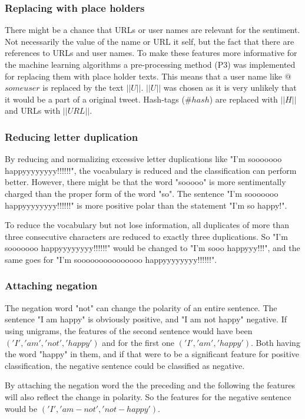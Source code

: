 \subsubsection{Replacing with place holders}
There might be a chance that URLs or user names are relevant for the sentiment. Not necessarily the value of the name or URL it self, but the fact that there are references to URLs and user names. To make these features more informative for the machine learning algorithms a pre-processing method (P3) was implemented for replacing them with place holder texts. This means that a user name like $@$$someuser$ is replaced by the text $||U||$. $||U||$ was chosen as it is very unlikely that it would be a part of a original tweet. Hash-tags ($\#hash$) are replaced with $||H||$ and URLs with $||URL||$. 

\subsubsection{Reducing letter duplication}
By reducing and normalizing excessive letter duplications like "I'm sooooooo happyyyyyyyy!!!!!!", the vocabulary is reduced and the classification can perform better. However, there might be that the word "sooooo" is more sentimentally charged than the proper form of the word "so". The sentence "I'm sooooooo happyyyyyyyy!!!!!!" is more positive polar than the statement "I'm so happy!". 

To reduce the vocabulary but not lose information, all duplicates of more than three consecutive characters are reduced to exactly three duplications. So "I'm sooooooo happyyyyyyyy!!!!!!" would be changed to "I'm sooo happyyy!!!", and the same goes for "I'm sooooooooooooooo happyyyyyyyy!!!!!!".

\subsubsection{Attaching negation}

The negation word "not" can change the polarity of an entire sentence. The sentence "I am happy" is obviously positive, and "I am not happy" negative. If using unigrams, the features of the second sentence would have been $('I', 'am', 'not', 'happy')$ and for the first one $('I', 'am', 'happy')$. Both having the word "happy" in them, and if that were to be a significant feature for positive classification, the negative sentence could be classified as negative. 

By attaching the negation word the the preceding and the following the features will also reflect the change in polarity. So the features for the negative sentence would be $('I', 'am-not', 'not-happy')$.




